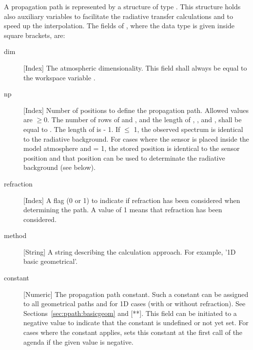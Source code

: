 \label{sec:ppath:Ppath}

A propagation path is represented by a structure of type
. This structure holds also auxiliary variables to
facilitate the radiative transfer calculations and to speed up the
interpolation. The fields of , where
the data type is given inside square brackets, are:
\begin{description}

  \item[dim] [Index] The atmospheric dimensionality. This field shall always 
     be equal to the workspace variable .
     
   \item[np] [Index] Number of positions to define the propagation
     path. Allowed values are $\geq 0$. The number of rows of
      and , and the length of
     , ,  and
     , shall be equal to . The length
     of  is  - 1. If 
     $\leq$ 1, the observed spectrum is identical to the radiative
     background. For cases where the sensor is placed inside the model
     atmosphere and  = 1, the stored position is
     identical to the sensor position and that position can be used to
     determinate the radiative background (see below).

   \item[refraction] [Index] A flag (0 or 1) to indicate if refraction
     has been considered when determining the path. A value of 1 means
     that refraction has been considered.

   \item[method] [String] A string describing the calculation approach.
     For example, '1D basic geometrical'.
     
   \item[constant] [Numeric] The propagation path constant. Such a
     constant can be assigned to all geometrical paths and for 1D
     cases (with or without refraction). See
     Sections~\ref{sec:ppath:basicgeom} and [**]. This field can be
     initiated to a negative value to indicate that the constant is
     undefined or not yet set. For cases where the constant applies,
      sets this constant at the first
     call of the agenda if the given value is negative.


\end{description}
